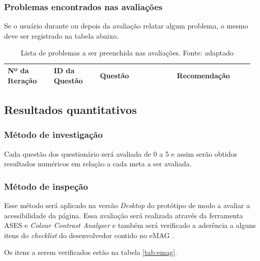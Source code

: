 \subsubsection{Problemas encontrados nas avaliações}

Se o usuário durante ou depois da avaliação relatar algum problema, o mesmo deve ser registrado na tabela abaixo.
\begin{table}[!h]
\caption{Lista de problemas a ser preenchida nas avaliações. Fonte: \cite{preece} adaptado}
\label{tab:problema}
  \begin{tabular}{p{0.18\linewidth}p{0.18\linewidth}p{0.30\linewidth}p{0.30\linewidth}}
  \hline
    Nº da Iteração & ID da Questão & Questão & Recomendação\\
 \hline
  \end{tabular}
\end{table}

\subsection{Resultados quantitativos}

  \subsubsection{Método de investigação}
  Cada questão dos questionário será avaliada de 0 a 5 e assim serão obtidos resultados numéricos
  em relação a cada meta a ser avaliada.

  
  \subsubsection{Método de inspeção}
  Esse método será aplicado na versão \textit{Desktop} do protótipo de modo a avaliar a acessibilidade da página.
  Essa avaliação será realizada através da ferramenta ASES e \textit{Colour Contrast Analyser} e também será
  verificado a aderência a alguns itens do \textit{checklist} do desenvolvedor contido no eMAG \cite{emag}.
  
  Os itens a serem verificados estão na tabela \ref{tab:emag}.
  

